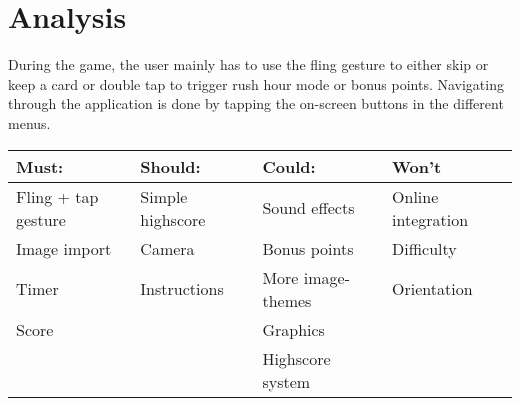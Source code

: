 \section{Analysis}
During the game, the user mainly has to use the fling gesture to either skip or keep a card or double tap to trigger rush hour mode or bonus points. Navigating through the application is done by tapping the on-screen buttons in the different menus.

\begin{table}[H]
	\begin{longtable}{|l|l|l|l|}
		\hline
		Must: & Should: & Could: & Won't \\ \hline
		Fling + tap gesture & Simple highscore & Sound effects & Online integration \\
		Image import & Camera & Bonus points & Difficulty \\
		Timer & Instructions & More image-themes & Orientation \\
		Score & & Graphics &  \\
		& & Highscore system & \\ \hline
	\end{longtable}
\end{table}
